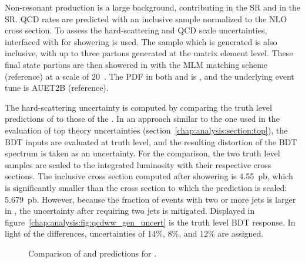 Non-resonant \wwtwoj production is a large background,
contributing  in the \emme SR and  in
the \eemm SR. QCD \wwtwoj rates are predicted with an
inclusive \SHERPA sample normalized to the NLO \MCFM cross section. To
assess the hard-scattering and QCD scale uncertainties, \MADGRAPH interfaced
with  for showering is used. The sample which is generated is
also inclusive, with up to three partons generated at the matrix
element
level. These final state partons are then showered in \PYTHIA with the
MLM matching scheme (reference) at a scale of 20~\gev. The PDF in
both \MADGRAPH and \PYTHIA is \cteqsixl, and the underlying event tune
is AUET2B (reference). 

The hard-scattering uncertainty is computed by comparing
the truth level predictions of \MADGRAPH to those of the \SHERPA. In
an approach similar to the one used in the evaluation of top theory
uncertainties (section~\ref{chap:analysis:section:top}), the BDT inputs are
evaluated at truth level, and the resulting distortion of the BDT
spectrum is taken as an uncertainty. For the comparison, the two truth level
samples are scaled to the integrated luminosity with their respective
cross sections. The inclusive \MADGRAPH cross section computed after showering
is 4.55~pb, which is significantly smaller than the cross section to
which the \SHERPA prediction is scaled: 5.679~pb. However, because the
fraction of events with two or more jets is larger in \MADGRAPH, the
uncertainty after requiring two jets is mitigated. Displayed in
figure~\ref{chap:analysis:fig:qcdww_gen_uncert} is the truth level BDT
response. In light of the differences, uncertainties of 14\%, 8\%, and
12\% are assigned.

\begin{figure}[h]
    \centering
    \caption[Comparison of \MADGRAPH and \SHERPA predictions
    for \ww.]{Comparison of \MADGRAPH and \SHERPA predictions
    for \ww.}
\label{chap:analysis:fig:ww_gen_uncert}
\end{figure}


